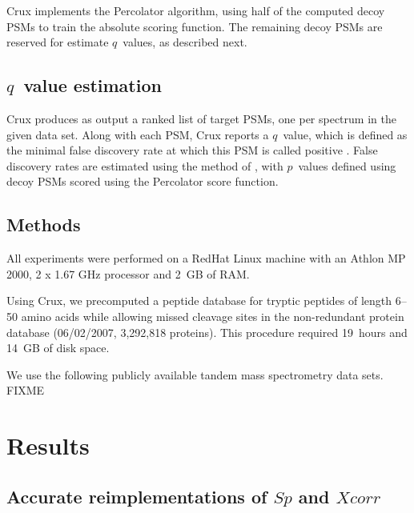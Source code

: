 \documentclass{bioinfo}
\renewcommand{\cite}{\citep}
\begin{document}
Crux implements the Percolator algorithm, using half of the computed
decoy PSMs to train the absolute scoring function.  The remaining
decoy PSMs are reserved for estimate $q$~values, as described next.

\subsection{$q$~value estimation}
\label{section:q-value}

Crux produces as output a ranked list of target PSMs, one per spectrum
in the given data set.  Along with each PSM, Crux reports a $q$~value,
which is defined as the minimal false discovery rate at which this PSM
is called positive \cite{storey:statistical}.  False discovery rates
are estimated using the method of \cite{benjamini:controlling}, with
$p$~values defined using decoy PSMs scored using the Percolator score
function.

\begin{methods}
\section{Methods}

All experiments were performed on a RedHat Linux machine with an
Athlon MP 2000, 2 x 1.67 GHz processor and 2~GB of RAM.

Using Crux, we precomputed a peptide database for tryptic peptides of
length 6--50 amino acids while allowing missed cleavage sites in the
non-redundant protein database (06/02/2007, 3,292,818 proteins). This
procedure required 19~hours and 14~GB of disk space.

We use the following publicly available tandem mass spectrometry data
sets.  FIXME

\end{methods}

\section{Results}

\subsection{Accurate reimplementations of $Sp$ and $Xcorr$}
\end{document}
